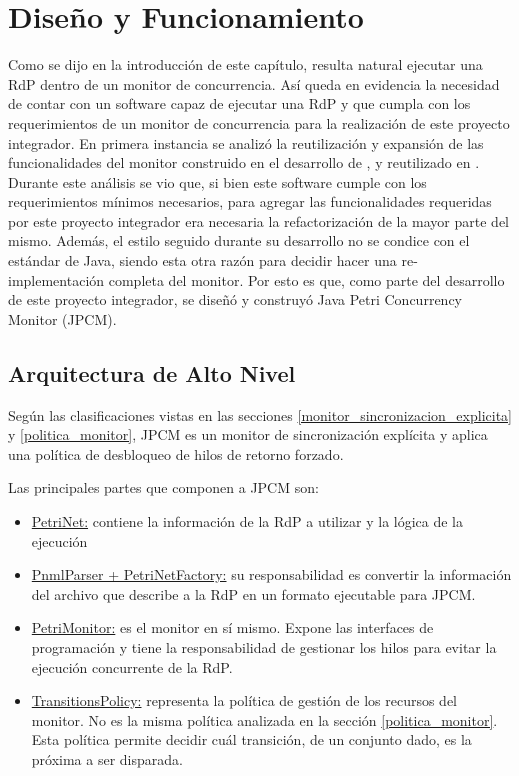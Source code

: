 \section{Diseño y Funcionamiento}

Como se dijo en la introducción de este capítulo, resulta natural ejecutar
una RdP dentro de un monitor de concurrencia. Así queda en evidencia la
necesidad de contar con un software capaz de ejecutar una RdP y que cumpla con
los requerimientos de un monitor de concurrencia para la realización de este
proyecto integrador.
En primera instancia se analizó la reutilización y expansión de las
funcionalidades del monitor construido en el desarrollo de \cite{codegen}, y
reutilizado en \cite{chimp}. Durante este análisis se vio que, si bien este
software cumple con los requerimientos mínimos necesarios, para agregar las
funcionalidades requeridas por este proyecto integrador era necesaria la
refactorización de la mayor parte del mismo. Además, el estilo seguido durante
su desarrollo no se condice con el estándar de Java, siendo esta otra razón
para decidir hacer una re-implementación completa del monitor.
Por esto es que, como parte del desarrollo de este proyecto integrador, se
diseñó y construyó Java Petri Concurrency Monitor (JPCM).

\subsection{Arquitectura de Alto Nivel}
\label{JPCM_arq_alto_nivel}

Según las clasificaciones vistas en las secciones
\ref{monitor_sincronizacion_explicita} y \ref{politica_monitor}, JPCM es un
monitor de sincronización explícita y aplica una política de desbloqueo de hilos
de retorno forzado.
 
Las principales partes que componen a JPCM son:
\begin{itemize}
  \item \underline{PetriNet:} contiene la información de la RdP a utilizar y la
  lógica de la ejecución
  \item \underline{PnmlParser + PetriNetFactory:} su responsabilidad es
  convertir la información del archivo que describe a la RdP en un formato
  ejecutable para JPCM.
  \item \underline{PetriMonitor:} es el monitor en sí mismo. Expone las
  interfaces de programación y tiene la responsabilidad de gestionar los hilos
  para evitar la ejecución concurrente de la RdP.
  \item \underline{TransitionsPolicy:} representa la política de gestión de los
  recursos del monitor. No es la misma política analizada en la sección
  \ref{politica_monitor}. Esta política permite decidir cuál transición, de un
  conjunto dado, es la próxima a ser disparada.
\end{itemize}

